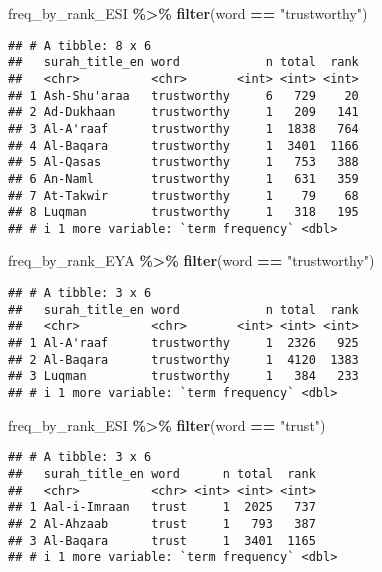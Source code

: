 \documentclass[
]{article}
\newenvironment{Shaded}{\begin{snugshade}}{\end{snugshade}}
\newcommand{\FunctionTok}[1]{\textcolor[rgb]{0.13,0.29,0.53}{\textbf{#1}}}
\newcommand{\NormalTok}[1]{#1}
\newcommand{\SpecialCharTok}[1]{\textcolor[rgb]{0.81,0.36,0.00}{\textbf{#1}}}
\newcommand{\StringTok}[1]{\textcolor[rgb]{0.31,0.60,0.02}{#1}}
\begin{document}
\footnotesize

\begin{Shaded}
\begin{Highlighting}[]
\NormalTok{freq\_by\_rank\_ESI }\SpecialCharTok{\%\textgreater{}\%} \FunctionTok{filter}\NormalTok{(word }\SpecialCharTok{==} \StringTok{"trustworthy"}\NormalTok{)}
\end{Highlighting}
\end{Shaded}

\begin{verbatim}
## # A tibble: 8 x 6
##   surah_title_en word            n total  rank
##   <chr>          <chr>       <int> <int> <int>
## 1 Ash-Shu'araa   trustworthy     6   729    20
## 2 Ad-Dukhaan     trustworthy     1   209   141
## 3 Al-A'raaf      trustworthy     1  1838   764
## 4 Al-Baqara      trustworthy     1  3401  1166
## 5 Al-Qasas       trustworthy     1   753   388
## 6 An-Naml        trustworthy     1   631   359
## 7 At-Takwir      trustworthy     1    79    68
## 8 Luqman         trustworthy     1   318   195
## # i 1 more variable: `term frequency` <dbl>
\end{verbatim}

\begin{Shaded}
\begin{Highlighting}[]
\NormalTok{freq\_by\_rank\_EYA }\SpecialCharTok{\%\textgreater{}\%} \FunctionTok{filter}\NormalTok{(word }\SpecialCharTok{==} \StringTok{"trustworthy"}\NormalTok{)}
\end{Highlighting}
\end{Shaded}

\begin{verbatim}
## # A tibble: 3 x 6
##   surah_title_en word            n total  rank
##   <chr>          <chr>       <int> <int> <int>
## 1 Al-A'raaf      trustworthy     1  2326   925
## 2 Al-Baqara      trustworthy     1  4120  1383
## 3 Luqman         trustworthy     1   384   233
## # i 1 more variable: `term frequency` <dbl>
\end{verbatim}

\begin{Shaded}
\begin{Highlighting}[]
\NormalTok{freq\_by\_rank\_ESI }\SpecialCharTok{\%\textgreater{}\%} \FunctionTok{filter}\NormalTok{(word }\SpecialCharTok{==} \StringTok{"trust"}\NormalTok{)}
\end{Highlighting}
\end{Shaded}

\begin{verbatim}
## # A tibble: 3 x 6
##   surah_title_en word      n total  rank
##   <chr>          <chr> <int> <int> <int>
## 1 Aal-i-Imraan   trust     1  2025   737
## 2 Al-Ahzaab      trust     1   793   387
## 3 Al-Baqara      trust     1  3401  1165
## # i 1 more variable: `term frequency` <dbl>
\end{verbatim}
\end{document}
